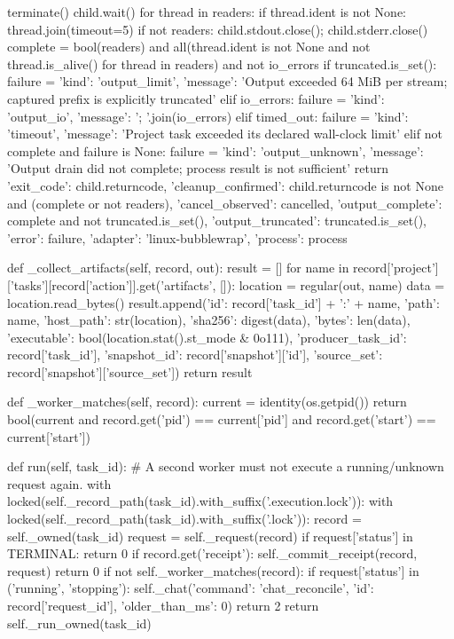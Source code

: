                 terminate()
            child.wait()
            for thread in readers:
                if thread.ident is not None:
                    thread.join(timeout=5)
            if not readers:
                child.stdout.close(); child.stderr.close()
        complete = bool(readers) and all(thread.ident is not None and not thread.is_alive() for thread in readers) and not io_errors
        if truncated.is_set():
            failure = {'kind': 'output_limit', 'message': 'Output exceeded 64 MiB per stream; captured prefix is explicitly truncated'}
        elif io_errors:
            failure = {'kind': 'output_io', 'message': '; '.join(io_errors)}
        elif timed_out:
            failure = {'kind': 'timeout', 'message': 'Project task exceeded its declared wall-clock limit'}
        elif not complete and failure is None:
            failure = {'kind': 'output_unknown', 'message': 'Output drain did not complete; process result is not sufficient'}
        return {'exit_code': child.returncode, 'cleanup_confirmed': child.returncode is not None and (complete or not readers),
                'cancel_observed': cancelled, 'output_complete': complete and not truncated.is_set(),
                'output_truncated': truncated.is_set(), 'error': failure, 'adapter': 'linux-bubblewrap', 'process': process}

    def _collect_artifacts(self, record, out):
        result = []
        for name in record['project']['tasks'][record['action']].get('artifacts', []):
            location = regular(out, name)
            data = location.read_bytes()
            result.append({'id': record['task_id'] + ':' + name, 'path': name, 'host_path': str(location),
                           'sha256': digest(data), 'bytes': len(data), 'executable': bool(location.stat().st_mode & 0o111),
                           'producer_task_id': record['task_id'], 'snapshot_id': record['snapshot']['id'],
                           'source_set': record['snapshot']['source_set']})
        return result

    def _worker_matches(self, record):
        current = identity(os.getpid())
        return bool(current and record.get('pid') == current['pid'] and record.get('start') == current['start'])

    def run(self, task_id):
        # A second worker must not execute a running/unknown request again.
        with locked(self._record_path(task_id).with_suffix('.execution.lock')):
            with locked(self._record_path(task_id).with_suffix('.lock')):
                record = self._owned(task_id)
            request = self._request(record)
            if request['status'] in TERMINAL:
                return 0
            if record.get('receipt'):
                self._commit_receipt(record, request)
                return 0
            if not self._worker_matches(record):
                if request['status'] in ('running', 'stopping'):
                    self._chat({'command': 'chat_reconcile', 'id': record['request_id'], 'older_than_ms': 0})
                return 2
            return self._run_owned(task_id)


